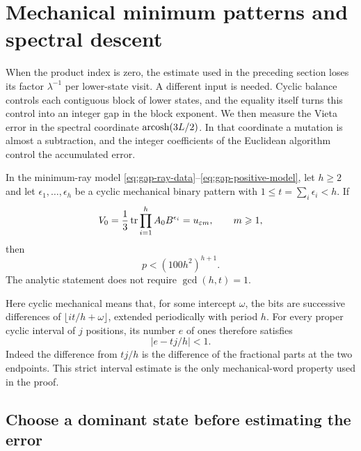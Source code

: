 \section{Mechanical minimum patterns and spectral descent}
\label{sec:spectral}

When the product index is zero, the estimate used in the preceding
section loses its factor $\lambda^{-1}$ per lower-state visit. A
different input is needed. Cyclic balance controls each contiguous
block of lower states, and the equality itself turns this control into
an integer gap in the block exponent. We then measure the Vieta error
in the spectral coordinate $\operatorname{arcosh}(3L/2)$. In that coordinate a
mutation is almost a subtraction, and the integer coefficients of
the Euclidean algorithm control the accumulated error.

\begin{theorem}
\label{thm:minimum-bound}
In the minimum-ray model \eqref{eq:gap-ray-data}--\eqref{eq:gap-positive-model},
let $h\geqslant2$ and let $\epsilon_1,\ldots,\epsilon_h$ be a cyclic
mechanical binary pattern with $1\leqslant t=\sum_i\epsilon_i<h$.
If
\begin{equation}\label{eq:spectral-minimum-equality}
 V_0=\frac13\operatorname{tr}\prod_{i=1}^h A_0B^{\epsilon_i}=u_{\varepsilon m},
 \qquad m\geqslant1,
\end{equation}
then
\begin{equation}\label{eq:spectral-final-bound}
 p<(100h^2)^{h+1}.
\end{equation}
The analytic statement does not require $\gcd(h,t)=1$.
\end{theorem}

Here cyclic mechanical means that, for some intercept $\omega$, the
bits are successive differences of
$\lfloor it/h+\omega\rfloor$, extended periodically with period $h$.
For every proper cyclic interval of $j$ positions, its number $e$ of
ones therefore satisfies
\begin{equation}\label{eq:spectral-balance}
 |e-tj/h|<1.
\end{equation}
Indeed the difference from $tj/h$ is the difference of the fractional
parts at the two endpoints. This strict interval estimate is the only
mechanical-word property used in the proof.

\subsection{Choose a dominant state before estimating the error}

